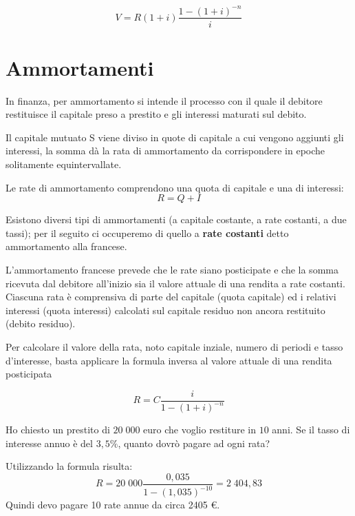 \begin{definizione} $$ 
V=R(1+i)\dfrac{1-(1+i)^{-n}}{i} $$ \end{definizione}

\section{Ammortamenti} In finanza, per ammortamento si intende il processo con 
il quale il debitore restituisce il capitale preso a prestito e gli interessi 
maturati sul debito.

Il capitale mutuato S viene diviso in quote di capitale a cui vengono aggiunti 
gli interessi, la somma dà la rata di ammortamento da corrispondere in epoche 
solitamente equintervallate.

Le rate di ammortamento comprendono una quota di capitale e una di interessi: 
$$R=Q+I$$

Esistono diversi tipi di ammortamenti (a capitale costante, a rate costanti, a 
due tassi); per il seguito ci occuperemo di quello a \textbf{rate costanti} 
detto ammortamento alla francese.

L'ammortamento francese prevede che le rate siano posticipate e che la somma 
ricevuta dal debitore all'inizio sia il valore attuale di una rendita a rate 
costanti. Ciascuna rata è comprensiva di parte del capitale (quota capitale) ed 
i relativi interessi (quota interessi) calcolati sul capitale residuo non ancora 
restituito (debito residuo). 

Per calcolare il valore della rata, noto capitale inziale, numero di periodi e 
tasso d'interesse, basta applicare la formula inversa al valore attuale di una 
rendita posticipata 

\begin{definizione}[Rata] $$ R=C\dfrac{i}{1-(1+i)^{-n}}$$ \end{definizione}

\begin{exrig} \begin{esempio} Ho chiesto un prestito di $20\;000$ euro che 
voglio restiture in $10$ anni. Se il tasso di interesse annuo è del $3,5\%$, 
quanto dovrò pagare ad ogni rata?

Utilizzando la formula risulta: $$ 
R=20\;000\dfrac{0,035}{1-(1,035)^{-10}}=2\;404,83$$ Quindi devo pagare 10 rate 
annue da circa 2405 €. \end{esempio} \end{exrig}

